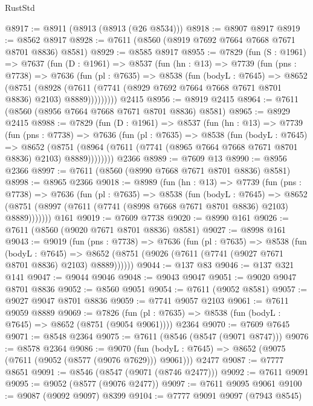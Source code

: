 \begin{lexlean}{RustStd}
\begin{coremodule}
@8917 := @8911 (@8913 (@8913 (@26 @8534)))
@8918 := @8907 @8917
@8919 := @8562 @8917
@8928 := @7611 (@8560 (@8919 @7692 @7664 @7668 @7671 @8701 @8836) @8581)
@8929 := @8585 @8917
@8955 := @7829
    (fun (S : @1961) =>
    @7637
      (fun (D : @1961) =>
      @8537
        (fun (hn : @13) =>
        @7739
          (fun (pns : @7738) =>
          @7636
            (fun (pl : @7635) =>
            @8538
              (fun (bodyL : @7645) =>
              @8652
                (@8751
                  (@8928
                    (@7611 (@7741 (@8929 @7692 @7664 @7668 @7671 @8701 @8836) @2103) @8889)))))))))
    @2415
@8956 := @8919 @2415
@8964 := @7611 (@8560 (@8956 @7664 @7668 @7671 @8701 @8836) @8581)
@8965 := @8929 @2415
@8988 := @7829
    (fun (D : @1961) =>
    @8537
      (fun (hn : @13) =>
      @7739
        (fun (pns : @7738) =>
        @7636
          (fun (pl : @7635) =>
          @8538
            (fun (bodyL : @7645) =>
            @8652
              (@8751 (@8964 (@7611 (@7741 (@8965 @7664 @7668 @7671 @8701 @8836) @2103) @8889))))))))
    @2366
@8989 := @7609 @13
@8990 := @8956 @2366
@8997 := @7611 (@8560 (@8990 @7668 @7671 @8701 @8836) @8581)
@8998 := @8965 @2366
@9018 := @8989
    (fun (hn : @13) =>
    @7739
      (fun (pns : @7738) =>
      @7636
        (fun (pl : @7635) =>
        @8538
          (fun (bodyL : @7645) =>
          @8652 (@8751 (@8997 (@7611 (@7741 (@8998 @7668 @7671 @8701 @8836) @2103) @8889)))))))
    @161
@9019 := @7609 @7738
@9020 := @8990 @161
@9026 := @7611 (@8560 (@9020 @7671 @8701 @8836) @8581)
@9027 := @8998 @161
@9043 := @9019
    (fun (pns : @7738) =>
    @7636
      (fun (pl : @7635) =>
      @8538
        (fun (bodyL : @7645) =>
        @8652 (@8751 (@9026 (@7611 (@7741 (@9027 @7671 @8701 @8836) @2103) @8889))))))
@9044 := @137 @83
@9046 := @137 @321 @141
@9047 := @9044 @9046
@9048 := @9043 @9047
@9051 := @9020 @9047 @8701 @8836
@9052 := @8560 @9051
@9054 := @7611 (@9052 @8581)
@9057 := @9027 @9047 @8701 @8836
@9059 := @7741 @9057 @2103
@9061 := @7611 @9059 @8889
@9069 := @7826
    (fun (pl : @7635) => @8538 (fun (bodyL : @7645) => @8652 (@8751 (@9054 @9061))))
    @2364
@9070 := @7609 @7645
@9071 := @8548 @2364
@9075 := @7611 (@8546 (@8547 (@9071 @8747)))
@9076 := @8578 @2364
@9086 := @9070
    (fun (bodyL : @7645) => @8652 (@9075 (@7611 (@9052 (@8577 (@9076 @7629))) @9061)))
    @2477
@9087 := @7777 @8651
@9091 := @8546 (@8547 (@9071 (@8746 @2477)))
@9092 := @7611 @9091
@9095 := @9052 (@8577 (@9076 @2477))
@9097 := @7611 @9095 @9061
@9100 := @9087 (@9092 @9097) @8399
@9104 := @7777 @9091 @9097 (@7943 @8545)

\end{coremodule}
\end{lexlean}
